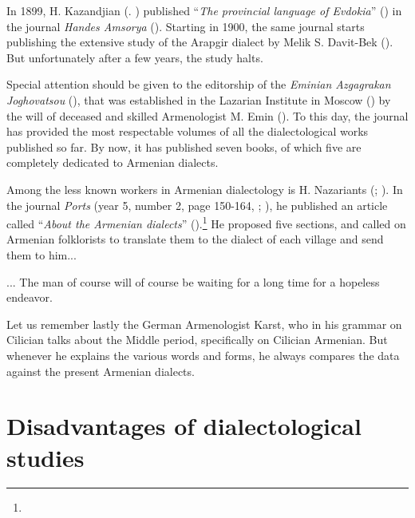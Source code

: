 In 1899, H. Kazandjian (. \citealt{KazandjianBook}) published ``\textit{The provincial language of Evdokia}'' () in the journal \textit{Handes Amsorya} (\citeauthor{HandesAmsorya}). Starting in 1900, the same journal starts publishing the extensive study of the Arapgir dialect by Melik S. Davit-Bek (). But unfortunately after a few years, the study halts. 

Special attention should be given to the editorship of the \textit{Eminian Azgagrakan Joghovatsou} (\citeauthor{Eminian}), that was established in the Lazarian Institute in Moscow () by the will of deceased and skilled Armenologist M. Emin (). To this day, the journal has provided the most respectable volumes of all the dialectological works published so far. By now, it has published seven books, of which five are completely dedicated to Armenian dialects. 

Among the less known workers in Armenian dialectology is H. Nazariants (; ). In the journal \textit{Ports} (year 5, number 2, page 150-164, ; ), he published an article called ``\textit{About the Armenian dialects}'' ().\footnote{} He proposed five sections, and called on Armenian folklorists to translate them to the dialect of each village and send them to him... 

\begin{adjarianpage}\label{page:4}\end{adjarianpage}%

... The man of course will of course be waiting for a long time for a hopeless endeavor. 

Let us remember lastly the German Armenologist Karst, who in his grammar on Cilician \citep{Karst-1901-MiddleArmenain} talks about the Middle period, specifically on Cilician Armenian. But whenever he explains the various words and forms, he always compares the data against the present Armenian dialects. 

\section{Disadvantages of dialectological studies}

